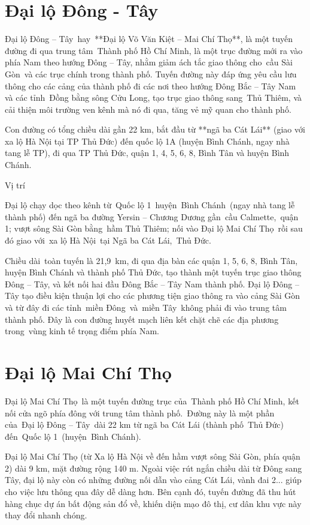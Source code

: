 \section{Đại lộ Đông - Tây}

Đại lộ Đông – Tây hay **Đại lộ Võ Văn Kiệt – Mai Chí Thọ**, là một tuyến đường đi qua trung tâm Thành phố Hồ Chí Minh, là một trục đường mới ra vào phía Nam theo hướng Đông – Tây, nhằm giảm ách tắc giao thông cho cầu Sài Gòn và các trục chính trong thành phố. Tuyến đường này đáp ứng yêu cầu lưu thông cho các cảng của thành phố đi các nơi theo hướng Đông Bắc – Tây Nam và các tỉnh Đồng bằng sông Cửu Long, tạo trục giao thông sang Thủ Thiêm, và cải thiện môi trường ven kênh mà nó đi qua, tăng vẻ mỹ quan cho thành phố.

Con đường có tổng chiều dài gần 22 km, bắt đầu từ **ngã ba Cát Lái** (giao với xa lộ Hà Nội tại TP Thủ Đức) đến quốc lộ 1A (huyện Bình Chánh, ngay nhà tang lễ TP), đi qua TP Thủ Đức, quận 1, 4, 5, 6, 8, Bình Tân và huyện Bình Chánh.

Vị trí

Đại lộ chạy dọc theo kênh từ Quốc lộ 1 huyện Bình Chánh (ngay nhà tang lễ thành phố) đến ngã ba đường Yersin – Chương Dương gần cầu Calmette, quận 1; vượt sông Sài Gòn bằng hầm Thủ Thiêm; nối vào Đại lộ Mai Chí Thọ rồi sau đó giao với xa lộ Hà Nội tại Ngã ba Cát Lái, Thủ Đức.

Chiều dài toàn tuyến là 21,9 km, đi qua địa bàn các quận 1, 5, 6, 8, Bình Tân, huyện Bình Chánh và thành phố Thủ Đức, tạo thành một tuyến trục giao thông Đông – Tây, và kết nối hai đầu Đông Bắc – Tây Nam thành phố. Đại lộ Đông – Tây tạo điều kiện thuận lợi cho các phương tiện giao thông ra vào cảng Sài Gòn và từ đây đi các tỉnh miền Đông và miền Tây không phải đi vào trung tâm thành phố. Đây là con đường huyết mạch liên kết chặt chẽ các địa phương trong vùng kinh tế trọng điểm phía Nam.

\section{Đại lộ Mai Chí Thọ}

Đại lộ Mai Chí Thọ là một tuyến đường trục của Thành phố Hồ Chí Minh, kết nối cửa ngõ phía đông với trung tâm thành phố. Đường này là một phần của Đại lộ Đông – Tây dài 22 km từ ngã ba Cát Lái (thành phố Thủ Đức) đến Quốc lộ 1 (huyện Bình Chánh).

Đại lộ Mai Chí Thọ (từ Xa lộ Hà Nội về đến hầm vượt sông Sài Gòn, phía quận 2) dài 9 km, mặt đường rộng 140 m. Ngoài việc rút ngắn chiều dài từ Đông sang Tây, đại lộ này còn có những đường nối dẫn vào cảng Cát Lái, vành đai 2... giúp cho việc lưu thông qua đây dễ dàng hơn. Bên cạnh đó, tuyến đường đã thu hút hàng chục dự án bất động sản đổ về, khiến diện mạo đô thị, cư dân khu vực này thay đổi nhanh chóng.

